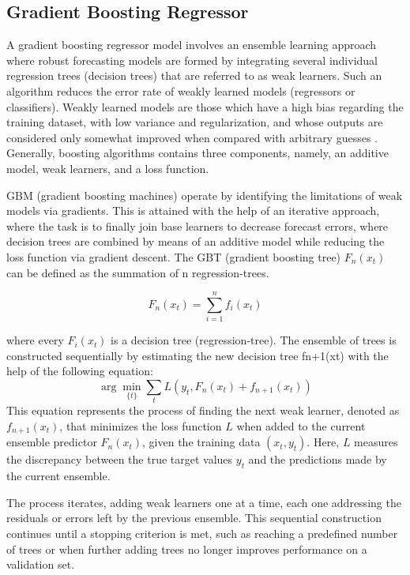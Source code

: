 \documentclass{ieeeojies}
\begin{document}
\subsection{Gradient Boosting Regressor}
A gradient boosting regressor model involves an ensemble learning approach where robust forecasting models are formed by integrating several individual regression trees (decision trees) that are referred to as weak learners. Such an algorithm reduces the error rate of weakly learned models (regressors or classifiers). Weakly learned models are those which have a high bias regarding the training dataset, with low variance and regularization, and whose outputs are considered only somewhat improved when compared with arbitrary guesses \cite{b11}. Generally, boosting algorithms contains three components, namely, an additive model, weak learners, and a loss function.

GBM (gradient boosting machines) operate by identifying the limitations of weak models via gradients. This is attained with the help of an iterative approach, where the task is to finally join base learners to decrease forecast errors, where decision trees are combined by means of an additive model while reducing the loss function via gradient descent. The GBT (gradient boosting tree) \( F_n(x_t) \) can be defined as the summation of n regression-trees.

\begin{equation}
    F_n(x_t) = \sum_{i=1}^{n} f_i(x_t)
\end{equation}

where every \(F_i(x_t)\) is a decision tree (regression-tree). The ensemble of trees is constructed
sequentially by estimating the new decision tree fn+1(xt) with the help of the following
equation:
\begin{equation}
    \arg\min_{\{t\}} \sum_{t} L\left(y_t, F_n(x_t) + f_{n+1}(x_t)\right)
\end{equation}
This equation represents the process of finding the next weak learner, denoted as $f_{n+1}(x_t)$, that minimizes the loss function $L$ when added to the current ensemble predictor $F_n(x_t)$, given the training data $(x_t, y_t)$. Here, $L$ measures the discrepancy between the true target values $y_t$ and the predictions made by the current ensemble.

The process iterates, adding weak learners one at a time, each one addressing the residuals or errors left by the previous ensemble. This sequential construction continues until a stopping criterion is met, such as reaching a predefined number of trees or when further adding trees no longer improves performance on a validation set.
\end{document}
